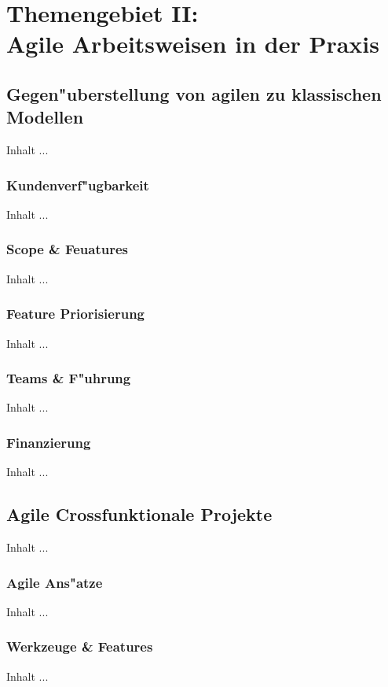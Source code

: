 
\chapter{Themengebiet II: \\Agile Arbeitsweisen in der Praxis}
\minitoc 
\vspace{1 cm} 

\section{Gegen"uberstellung von agilen zu klassischen Modellen}
Inhalt ...

\subsection{Kundenverf"ugbarkeit}
Inhalt ...


\subsection{Scope \& Feuatures}
Inhalt ...

\subsection{Feature Priorisierung}
Inhalt ...

\subsection{Teams \& F"uhrung}
Inhalt ...

\subsection{Finanzierung}
Inhalt ...


\section{Agile Crossfunktionale Projekte}
Inhalt ...

\subsection{Agile Ans"atze}
Inhalt ...

\subsection{Werkzeuge \& Features}
Inhalt ...
